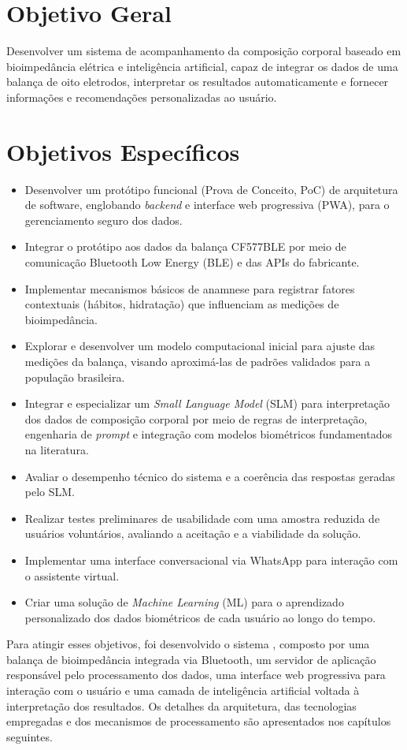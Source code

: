 \section{Objetivo Geral}

Desenvolver um sistema de acompanhamento da composição corporal baseado em bioimpedância
elétrica e inteligência artificial, capaz de integrar os dados de uma balança de oito
eletrodos, interpretar os resultados automaticamente e fornecer informações e
recomendações personalizadas ao usuário.

\section{Objetivos Específicos}

\begin{itemize}
    \item Desenvolver um protótipo funcional (Prova de Conceito, PoC) de arquitetura de
    software, englobando \emph{backend} e interface web progressiva (PWA), para o
    gerenciamento seguro dos dados.
    \item Integrar o protótipo aos dados da balança CF577BLE por meio de comunicação
    Bluetooth Low Energy (BLE) e das APIs do fabricante.
    \item Implementar mecanismos básicos de anamnese para registrar fatores contextuais
    (hábitos, hidratação) que influenciam as medições de bioimpedância.
    \item Explorar e desenvolver um modelo computacional inicial para ajuste das medições
    da balança, visando aproximá-las de padrões validados para a população brasileira.
    \item Integrar e especializar um \emph{Small Language Model} (SLM) para interpretação
    dos dados de composição corporal por meio de regras de interpretação, engenharia de
    \emph{prompt} e integração com modelos biométricos fundamentados na literatura.
    \item Avaliar o desempenho técnico do sistema e a coerência das respostas geradas pelo
    SLM.
    \item Realizar testes preliminares de usabilidade com uma amostra reduzida de usuários
    voluntários, avaliando a aceitação e a viabilidade da solução.
    \item Implementar uma interface conversacional via WhatsApp para interação com o
    assistente virtual.
    \item Criar uma solução de \emph{Machine Learning} (ML) para o aprendizado
    personalizado dos dados biométricos de cada usuário ao longo do tempo.
\end{itemize}

Para atingir esses objetivos, foi desenvolvido o sistema \sintonia, composto por uma
balança de bioimpedância integrada via Bluetooth, um servidor de aplicação responsável
pelo processamento dos dados, uma interface web progressiva para interação com o usuário e
uma camada de inteligência artificial voltada à interpretação dos resultados. Os detalhes
da arquitetura, das tecnologias empregadas e dos mecanismos de processamento são
apresentados nos capítulos seguintes.
